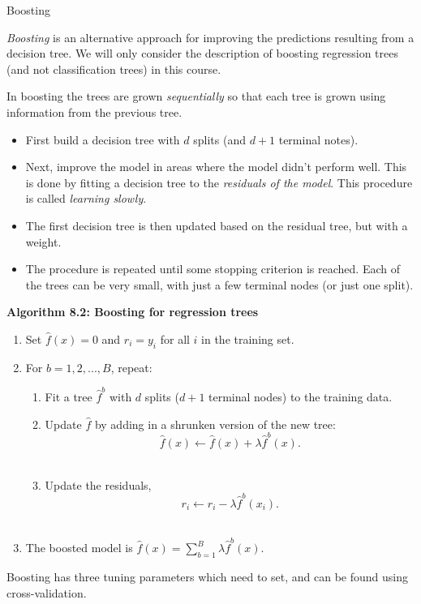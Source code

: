 \documentclass[10pt,ignorenonframetext,]{beamer}
\providecommand{\tightlist}{%
  \setlength{\itemsep}{0pt}\setlength{\parskip}{0pt}}
\begin{document}
\begin{frame}{Boosting}

\emph{Boosting} is an alternative approach for improving the predictions
resulting from a decision tree. We will only consider the description of
boosting regression trees (and not classification trees) in this course.

In boosting the trees are grown \emph{sequentially} so that each tree is
grown using information from the previous tree.

\begin{itemize}
\tightlist
\item
  First build a decision tree with \(d\) splits (and \(d+1\) terminal
  notes).
\item
  Next, improve the model in areas where the model didn't perform well.
  This is done by fitting a decision tree to the \emph{residuals of the
  model}. This procedure is called \emph{learning slowly}.
\item
  The first decision tree is then updated based on the residual tree,
  but with a weight.
\item
  The procedure is repeated until some stopping criterion is reached.
  Each of the trees can be very small, with just a few terminal nodes
  (or just one split).
\end{itemize}

\end{frame}

\begin{frame}

\textbf{Algorithm 8.2: Boosting for regression trees}

\begin{enumerate}
\def\labelenumi{\arabic{enumi}.}
\tightlist
\item
  Set \(\hat{f}(x) = 0\) and \(r_i = y_i\) for all \(i\) in the training
  set.
\item
  For \(b=1,2,...,B\), repeat:

  \begin{enumerate}
  \def\labelenumii{\alph{enumii})}
  \tightlist
  \item
    Fit a tree \(\hat{f}^b\) with \(d\) splits (\(d+1\) terminal nodes)
    to the training data.\\
  \item
    Update \(\hat{f}\) by adding in a shrunken version of the new tree:
    \[\hat{f}(x) \leftarrow \hat{f}(x)+\lambda \hat{f}^b(x).\]\\
  \item
    Update the residuals,
    \[r_i \leftarrow r_i - \lambda \hat{f}^b(x_i).\]\\
  \end{enumerate}
\item
  The boosted model is
  \(\hat{f}(x) = \sum_{b=1}^B \lambda \hat{f}^b(x).\)
\end{enumerate}

Boosting has three tuning parameters which need to set, and can be found
using cross-validation.

\end{frame}
\end{document}
